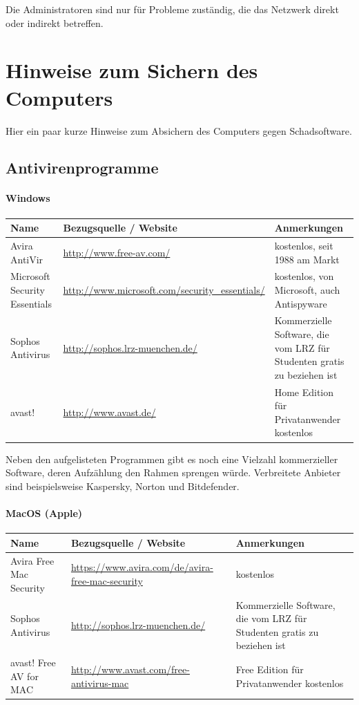 \documentclass[a4paper,12pt]{scrartcl}
\begin{document}
Die Administratoren sind nur für Probleme zuständig, die das Netzwerk direkt oder indirekt betreffen. 

\newpage
\section*{Hinweise zum Sichern des Computers}

Hier ein paar kurze Hinweise zum Absichern des Computers gegen Schadsoftware.

\subsection*{Antivirenprogramme}
\paragraph*{Windows}
\begin{center}
  \begin{tabularx}{\linewidth}{|p{.2\linewidth}XX|}
    \hline
    Name & Bezugsquelle / Website & Anmerkungen\\
    \hline \hline
    Avira AntiVir & \url{http://www.free-av.com/} & kostenlos, seit 1988 am Markt\\
    \hline
    Microsoft Security Essentials & \url{http://www.microsoft.com/security\_essentials/} & kostenlos, von Microsoft, auch Antispyware\\
    \hline
    Sophos Antivirus & \url{http://sophos.lrz-muenchen.de/} & Kommerzielle Software, die vom LRZ für Studenten gratis zu beziehen ist\\
    \hline
    avast! & \url{http://www.avast.de/} & Home Edition für Privatanwender kostenlos\\
    \hline
  \end{tabularx}
\end{center}

Neben den aufgelisteten Programmen gibt es noch eine Vielzahl kommerzieller Software, deren Aufzählung den Rahmen sprengen würde. Verbreitete Anbieter sind beispielsweise Kaspersky, Norton und Bitdefender.

\paragraph*{MacOS (Apple)}
\begin{center}
  \begin{tabularx}{\linewidth}{|p{.2\linewidth}XX|}
    \hline
    Name & Bezugsquelle / Website & Anmerkungen\\
    \hline \hline
    Avira Free Mac Security & \url{https://www.avira.com/de/avira-free-mac-security} & kostenlos\\
    \hline
    Sophos Antivirus & \url{http://sophos.lrz-muenchen.de/} & Kommerzielle Software, die vom LRZ für Studenten gratis zu beziehen ist\\
    \hline
    avast! Free AV for MAC & \url{http://www.avast.com/free-antivirus-mac} & Free Edition für Privatanwender kostenlos\\
    \hline
  \end{tabularx}
\end{center}
\end{document}
